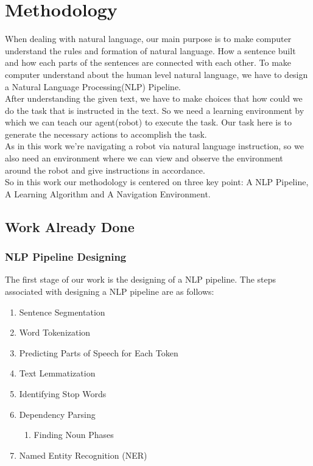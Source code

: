 \section{Methodology}	
When dealing with natural language, our main purpose is to make computer understand the rules and formation of
natural language. How a sentence built and how each parts of the sentences are connected with each other. To make computer understand about the human level natural language, we have to design a Natural Language Processing(NLP) Pipeline.\\ 
	
After understanding the given text, we have to make choices that how could we do the task that is instructed in the text. So we need a learning environment by which we can teach our agent(robot) to execute the task. Our task
here is to generate the necessary actions to accomplish the task.\\
	
As in this work we're navigating a robot via natural language instruction, so we also need an environment
where we can view and observe the environment around the robot and give instructions in accordance.\\
	
So in this work our methodology is centered on three key point: A NLP Pipeline, A Learning Algorithm and A Navigation Environment. \\

\subsection{Work Already Done}

\subsubsection{NLP Pipeline Designing}

The first stage of our work is the designing of a NLP pipeline. The steps associated with designing a NLP pipeline are as follows: \\

\begin{enumerate}
    \item Sentence Segmentation
    \item Word Tokenization
    \item Predicting Parts of Speech for Each Token
    \item Text Lemmatization
    \item Identifying Stop Words
    \item Dependency Parsing
    \begin{enumerate}
        \item Finding Noun Phases
    \end{enumerate}
    \item Named Entity Recognition (NER)
\end{enumerate}
\vline

